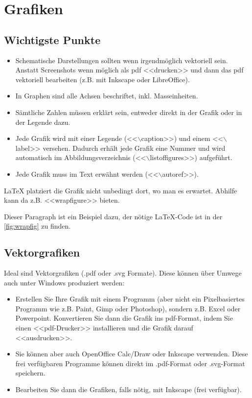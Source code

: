 \chapter{Grafiken}\label{sec:grafiken}
\section{Wichtigste Punkte}
\begin{itemize}
	\item Schematische Darstellungen sollten wenn irgendmöglich vektoriell sein.
		Anstatt Screen\-shots wenn möglich als pdf <<drucken>> und dann das pdf
		vektoriell bearbeiten (z.B. mit Inkscape oder LibreOffice).
	\item In Graphen sind alle Achsen beschriftet, inkl. Masseinheiten.
	\item Sämtliche Zahlen müssen erklärt sein, entweder direkt in der Grafik
		oder in der Legende dazu.
	\item Jede Grafik wird mit einer Legende (<<$\backslash$caption>>) und einem
	<<$\backslash$label>> versehen. Dadurch erhält jede Grafik eine Nummer und wird
	automatisch im Abbildungsverzeichnis (<<$\backslash$listoffigures>>) aufgeführt.
%
	\item Jede Grafik muss im Text erwähnt werden (<<$\backslash$autoref>>).
\end{itemize}



\LaTeX{} platziert die Grafik nicht unbedingt dort, wo man es
erwartet. Abhilfe kann da z.B. <<wrapfigure>> bieten.

Dieser Paragraph ist ein Beispiel dazu, der nötige 
\LaTeX-Code ist in der \autoref{fig:wrapfig} zu finden.


\section{Vektorgrafiken}
Ideal sind Vektorgrafiken (.pdf oder .svg Formate). Diese können über
Umwege auch unter Windows produziert werden:
\begin{itemize}
\item Erstellen Sie Ihre Grafik mit einem Programm (aber nicht ein
  Pixelbasiertes Programm wie z.B. Paint, Gimp oder Photoshop),
  sondern z.B. Excel oder Powerpoint. Konvertieren Sie dann die Grafik
  ins pdf-Format, indem Sie einen <<pdf-Drucker>> installieren und die
  Grafik darauf <<ausdrucken>>.
\item Sie können aber auch OpenOffice Calc/Draw oder Inkscape
  verwenden. Diese frei verfügbaren Programme können direkt im
  .pdf-Format oder .svg-Format speichern.
\item Bearbeiten Sie dann die Grafiken, falls nötig, mit Inkscape
  (frei verfügbar).
\end{itemize}

